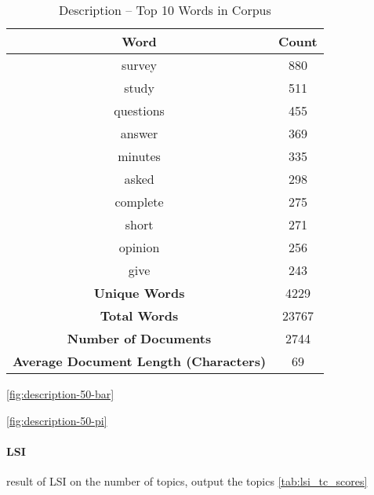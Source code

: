 \documentclass[letterpaper,12pt]{article}
\begin{document}
\begin{table}
	\caption{\label{tab:description_top_words} Description -- Top 10 Words in Corpus}
	\begin{center}
		\begin{tabular}{|c|c|}
			\hline
			\textbf{Word} & \textbf{Count} \\
			\hline
			survey & 880 \\
			\hline
			study & 511 \\
			\hline
			questions & 455 \\
			\hline
			answer & 369 \\
			\hline
			minutes & 335 \\
			\hline
			asked & 298 \\
			\hline
			complete & 275 \\
			\hline
			short & 271 \\
			\hline
			opinion & 256 \\
			\hline
			give & 243 \\
			\hline
			\textbf{Unique Words} & 4229 \\
			\hline
			\textbf{Total Words} & 23767 \\
			\hline
			\textbf{Number of Documents} & 2744 \\
			\hline
			\textbf{Average Document Length (Characters)} & 69 \\
			\hline
		\end{tabular}
	\end{center}
\end{table}

\ref{fig:description-50-bar}

\ref{fig:description-50-pi}

\newpage
\paragraph{LSI}
result of LSI on the number of topics, output the topics
\ref{tab:lsi_tc_scores}
\end{document}
